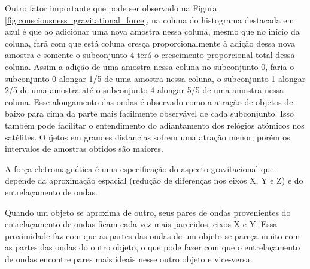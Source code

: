 Outro fator importante que pode ser observado na Figura \ref{fig:consciousness_gravitational_force}, na coluna do histograma destacada em azul é que ao adicionar uma nova amostra nessa coluna, mesmo que no início da coluna, fará com que está coluna cresça proporcionalmente à adição dessa nova amostra e somente o subconjunto 4 terá o crescimento proporcional total dessa coluna. Assim a adição de uma amostra nessa coluna no subconjunto 0, faria o subconjunto 0 alongar 1/5 de uma amostra nessa coluna, o subconjunto 1 alongar 2/5 de uma amostra até o subconjunto 4 alongar 5/5 de uma amostra nessa coluna. Esse alongamento das ondas é observado como a atração de objetos de baixo para cima da parte mais facilmente observável de cada subconjunto. Isso também pode facilitar o entendimento do adiantamento dos relógios atómicos nos satélites. Objetos em grandes distancias sofrem uma atração menor, porém os intervalos de amostras obtidos são maiores.

A força eletromagnética é uma especificação do aspecto gravitacional que depende da aproximação espacial (redução de diferenças nos eixos X, Y e Z) e do entrelaçamento de ondas.

Quando um objeto se aproxima de outro, seus pares de ondas provenientes do entrelaçamento de ondas ficam cada vez mais parecidos, eixos X e Y. Essa proximidade faz com que as partes das ondas de um objeto se pareça muito com as partes das ondas do outro objeto, o que pode fazer com que o entrelaçamento de ondas encontre pares mais ideais nesse outro objeto e vice-versa.  

